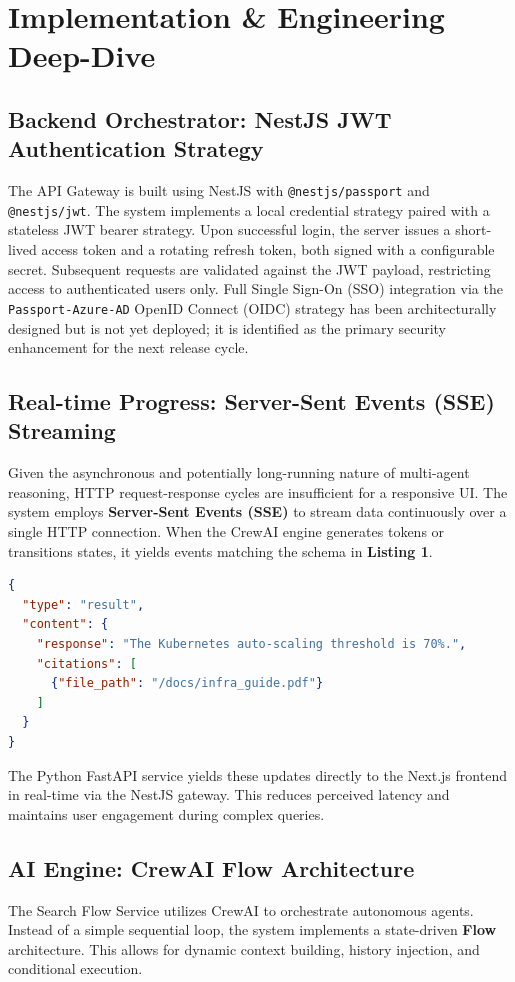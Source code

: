 \documentclass[12pt]{article}
\begin{document}
\section{Implementation \& Engineering Deep-Dive}

\subsection{Backend Orchestrator: NestJS JWT Authentication Strategy}
The API Gateway is built using NestJS with \texttt{@nestjs/passport} and \texttt{@nestjs/jwt}. The system implements a local credential strategy paired with a stateless JWT bearer strategy. Upon successful login, the server issues a short-lived access token and a rotating refresh token, both signed with a configurable secret. Subsequent requests are validated against the JWT payload, restricting access to authenticated users only. Full Single Sign-On (SSO) integration via the \texttt{Passport-Azure-AD} OpenID Connect (OIDC) strategy has been architecturally designed but is not yet deployed; it is identified as the primary security enhancement for the next release cycle.

\subsection{Real-time Progress: Server-Sent Events (SSE) Streaming}
Given the asynchronous and potentially long-running nature of multi-agent reasoning, HTTP request-response cycles are insufficient for a responsive UI. The system employs \textbf{Server-Sent Events (SSE)} to stream data continuously over a single HTTP connection. When the CrewAI engine generates tokens or transitions states, it yields events matching the schema in \textbf{Listing 1}.

\begin{lstlisting}[language=json, caption=SSE Progress Stream Schema]
{
  "type": "result",
  "content": {
    "response": "The Kubernetes auto-scaling threshold is 70%.",
    "citations": [
      {"file_path": "/docs/infra_guide.pdf"}
    ]
  }
}
\end{lstlisting}

The Python FastAPI service yields these updates directly to the Next.js frontend in real-time via the NestJS gateway. This reduces perceived latency and maintains user engagement during complex queries.

\subsection{AI Engine: CrewAI Flow Architecture}
The Search Flow Service utilizes CrewAI to orchestrate autonomous agents. Instead of a simple sequential loop, the system implements a state-driven \textbf{Flow} architecture. This allows for dynamic context building, history injection, and conditional execution.
\end{document}
